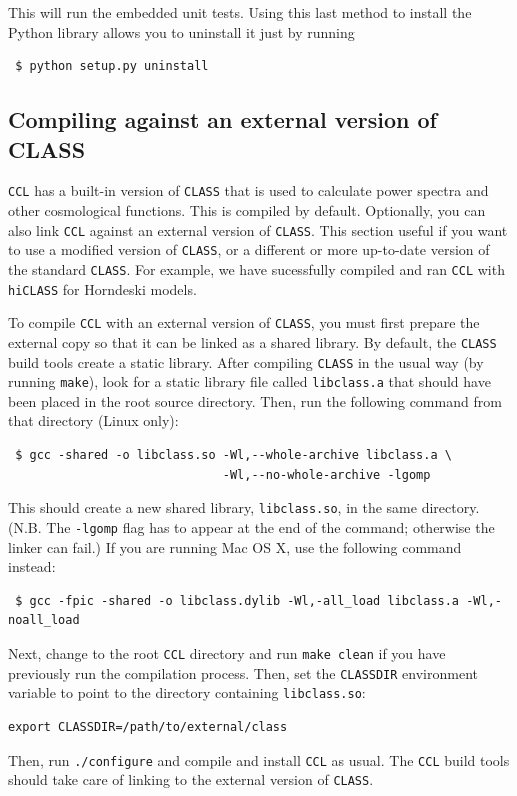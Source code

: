 \documentclass[\docopts]{\docclass}
\begin{document}
This will run the embedded unit tests. Using this last method to install the Python library allows you to uninstall it just by running
\begin{verbatim}
 $ python setup.py uninstall
\end{verbatim}
 
\subsection{Compiling against an external version of CLASS}

{\tt CCL} has a built-in version of {\tt CLASS} that is used to calculate power spectra and other cosmological functions. This is compiled by default. Optionally, you can also link {\tt CCL} against an external version of {\tt CLASS}. This section useful if you want to use a modified version of {\tt CLASS}, or a different or more up-to-date version of the standard {\tt CLASS}. For example, we have sucessfully compiled and ran {\tt CCL} with {\tt hiCLASS} \citep{hiclass} for Horndeski models.

To compile {\tt CCL} with an external version of {\tt CLASS}, you must first prepare the external copy so that it can be linked as a shared library. By default, the {\tt CLASS} build tools create a static library. After compiling {\tt CLASS} in the usual way (by running {\tt make}), look for a static library file called {\tt libclass.a} that should have been placed in the root source directory. Then, run the following command from that directory (Linux only):
\begin{verbatim}
 $ gcc -shared -o libclass.so -Wl,--whole-archive libclass.a \
                              -Wl,--no-whole-archive -lgomp
\end{verbatim}
This should create a new shared library, {\tt libclass.so}, in the same directory. (N.B. The {\tt -lgomp} flag has to appear at the end of the command; otherwise the linker can fail.) If you are running Mac OS X, use the following command instead:
\begin{verbatim}
 $ gcc -fpic -shared -o libclass.dylib -Wl,-all_load libclass.a -Wl,-noall_load
\end{verbatim}

Next, change to the root {\tt CCL} directory and run {\tt make clean} if you have previously run the compilation process. Then, set the {\tt CLASSDIR} environment variable to point to the directory containing {\tt libclass.so}:
\begin{verbatim}
export CLASSDIR=/path/to/external/class
\end{verbatim}
Then, run {\tt ./configure} and compile and install {\tt CCL} as usual. The {\tt CCL} build tools should take care of linking to the external version of {\tt CLASS}.
\end{document}
